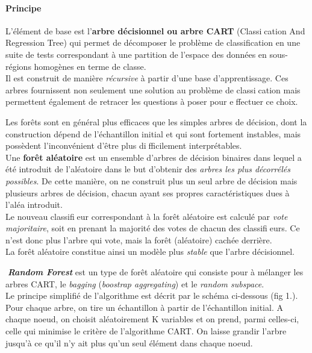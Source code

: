 \documentclass[11pt]{article}
\begin{document}
\paragraph{Principe}\label{principe}

L'élément de base est l'\textbf{arbre décisionnel ou arbre CART}
(Classi􏰂cation And Regression Tree) qui permet de décomposer le problème
de classification en une suite de tests correspondant à une partition de
l'espace des données en sous-régions homogènes en terme de classe.\\
Il est construit de manière \emph{récursive} à partir d'une base
d'apprentissage. Ces arbres fournissent non seulement une solution au
problème de classi􏰂cation mais permettent également de retracer les
questions à poser pour e􏰀ffectuer ce choix.

Les forêts sont en général plus efficaces que les simples arbres de
décision, dont la construction dépend de l'échantillon initial et qui
sont fortement instables, mais possèdent l'inconvénient d'être plus
di􏰃fficilement interprétables.\\
Une \textbf{forêt aléatoire} est un ensemble d'arbres de décision
binaires dans lequel a été introduit de l'aléatoire dans le but
d'obtenir des \emph{arbres les plus décorrélés possibles}. De cette
manière, on ne construit plus un seul arbre de décision mais plusieurs
arbres de décision, chacun ayant ses propres caractéristiques dues à
l'aléa introduit.\\
Le nouveau classifi􏰂eur correspondant à la forêt aléatoire est calculé
par \emph{vote majoritaire}, soit en prenant la majorité des votes de
chacun des classifi􏰂eurs. Ce n'est donc plus l'arbre qui vote, mais la
forêt (aléatoire) cachée derrière.\\
La forêt aléatoire constitue ainsi un modèle plus \emph{stable} que
l'arbre décisionnel.

􏰁\textbf{\emph{Random Forest}} est un type de forêt aléatoire qui
consiste pour à mélanger les arbres CART, le \emph{bagging}
(\emph{boostrap aggregating}) et le \emph{random subspace}.\\
Le principe simplifié de l'algorithme est décrit par le schéma
ci-dessous (fig 1.).\\
Pour chaque arbre, on tire un échantillon à partir de l'échantillon
initial. A chaque noeud, on choisit aléatoirement K variables et on
prend, parmi celles-ci, celle qui minimise le critère de l'algorithme
CART. On laisse grandir l'arbre jusqu'à ce qu'il n'y ait plus qu'un seul
élément dans chaque noeud.
\end{document}
